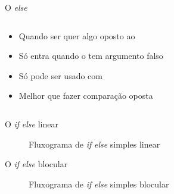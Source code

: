 \documentclass[14pt]{beamer}
\begin{document}
		\begin{frame}{O \textit{else}}
			\begin{columns}
				\begin{column}{0.65\textwidth}
					\begin{itemize}
						\presentationPause\item Quando ser quer algo oposto ao 
						\presentationPause\item Só entra quando o  tem argumento falso
						\presentationPause\item Só pode ser usado com 
						\presentationPause\item Melhor que fazer comparação oposta
					\end{itemize}
					\presentationPause
				\end{column}
				\begin{column}{0.35\textwidth}  %
					\presentationPause
				\end{column}
			\end{columns}
		\end{frame}

		\begin{frame}{O \textit{if} \textit{else} linear}
			\begin{figure}[H]
				\centering
				
				\caption{Fluxograma de \textit{if} \textit{else} simples linear}
				\label{fig.flow.if.line}
			\end{figure}
		\end{frame}

		\begin{frame}{O \textit{if} \textit{else} blocular}
			\begin{figure}[H]
				\centering
				
				\caption{Fluxograma de \textit{if} \textit{else} simples blocular}
				\label{fig.flow.ifelse.block}
			\end{figure}
		\end{frame}
\end{document}
